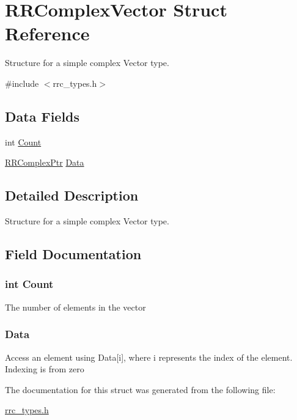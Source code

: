 \hypertarget{struct_r_r_complex_vector}{\section{R\-R\-Complex\-Vector Struct Reference}
\label{struct_r_r_complex_vector}
}


Structure for a simple complex Vector type.  




{\ttfamily \#include $<$rrc\-\_\-types.\-h$>$}

\subsection*{Data Fields}
\begin{DoxyCompactItemize}
\item 
int \hyperlink{struct_r_r_complex_vector_aad462966ed963f892117056de1eba502}{Count}
\item 
\hyperlink{rrc__types_8h_ada2046d7326c56ae29d8510fbf6622ee}{R\-R\-Complex\-Ptr} \hyperlink{struct_r_r_complex_vector_a2853286fc6b37960bba4c8871da839fa}{Data}
\end{DoxyCompactItemize}


\subsection{Detailed Description}
Structure for a simple complex Vector type. 

\subsection{Field Documentation}
\hypertarget{struct_r_r_complex_vector_aad462966ed963f892117056de1eba502}{
\subsubsection[{Count}]{\setlength{\rightskip}{0pt plus 5cm}int Count}}\label{struct_r_r_complex_vector_aad462966ed963f892117056de1eba502}
The number of elements in the vector \hypertarget{struct_r_r_complex_vector_a2853286fc6b37960bba4c8871da839fa}{
\subsubsection[{Data}]{ Data}}\label{struct_r_r_complex_vector_a2853286fc6b37960bba4c8871da839fa}
Access an element using Data\mbox{[}i\mbox{]}, where i represents the index of the element. Indexing is from zero 

The documentation for this struct was generated from the following file\-:\begin{DoxyCompactItemize}
\item 
\hyperlink{rrc__types_8h}{rrc\-\_\-types.\-h}\end{DoxyCompactItemize}
